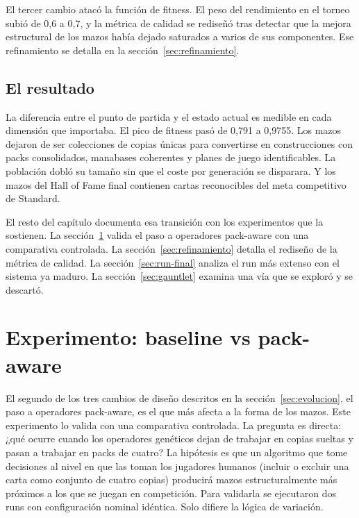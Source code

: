 El tercer cambio atacó la función de fitness. El peso del rendimiento en el torneo subió de 0,6 a 0,7, y la métrica de calidad se rediseñó tras detectar que la mejora estructural de los mazos había dejado saturados a varios de sus componentes. Ese refinamiento se detalla en la sección~\ref{sec:refinamiento}.

\subsection{El resultado}

La diferencia entre el punto de partida y el estado actual es medible en cada dimensión que importaba. El pico de fitness pasó de 0,791 a 0,9755. Los mazos dejaron de ser colecciones de copias únicas para convertirse en construcciones con packs consolidados, manabases coherentes y planes de juego identificables. La población dobló su tamaño sin que el coste por generación se disparara. Y los mazos del Hall of Fame final contienen cartas reconocibles del meta competitivo de Standard.

El resto del capítulo documenta esa transición con los experimentos que la sostienen. La sección~\ref{sec:experimento-ab} valida el paso a operadores pack-aware con una comparativa controlada. La sección~\ref{sec:refinamiento} detalla el rediseño de la métrica de calidad. La sección~\ref{sec:run-final} analiza el run más extenso con el sistema ya maduro. La sección~\ref{sec:gauntlet} examina una vía que se exploró y se descartó.

\section{Experimento: baseline vs pack-aware}
\label{sec:experimento-ab}

El segundo de los tres cambios de diseño descritos en la sección~\ref{sec:evolucion}, el paso a operadores pack-aware, es el que más afecta a la forma de los mazos. Este experimento lo valida con una comparativa controlada. La pregunta es directa: ¿qué ocurre cuando los operadores genéticos dejan de trabajar en copias sueltas y pasan a trabajar en packs de cuatro? La hipótesis es que un algoritmo que tome decisiones al nivel en que las toman los jugadores humanos (incluir o excluir una carta como conjunto de cuatro copias) producirá mazos estructuralmente más próximos a los que se juegan en competición. Para validarla se ejecutaron dos runs con configuración nominal idéntica. Solo difiere la lógica de variación.

